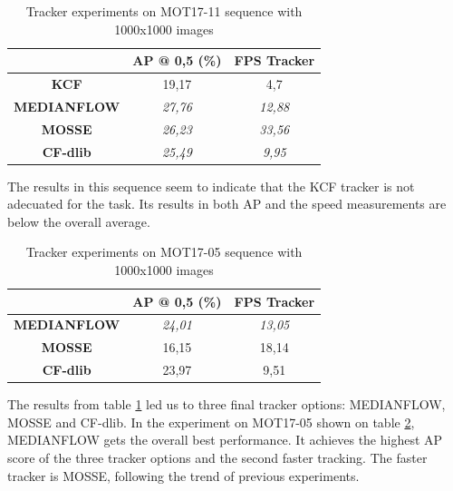 \begin{table}[H]
\scriptsize
\begin{center}
\begin{tabular}{|c|c|c|}
\hline
\textbf{}           & \textbf{AP @ 0,5 (\%)} & \textbf{FPS Tracker} \\ \hline
\textbf{KCF}        & 19,17                  & 4,7                  \\ \hline
\textbf{MEDIANFLOW} & \textit{27,76}         & \textit{12,88}       \\ \hline
\textbf{MOSSE}      & \textit{26,23}         & \textit{33,56}       \\ \hline
\textbf{CF-dlib}    & \textit{25,49}         & \textit{9,95}        \\ \hline
\end{tabular}
\end{center}
\caption{Tracker experiments on MOT17-11 sequence with 1000x1000 images}
\label{tab:tracker_exp_2}
\end{table}
The results in this sequence seem to indicate that the KCF tracker is not adecuated for the task. Its results in both AP and the speed measurements are below the overall average.
\begin{table}[H]
\scriptsize
\begin{center}
\begin{tabular}{|c|c|c|}
\hline
\textbf{}           & \textbf{AP @ 0,5 (\%)} & \textbf{FPS Tracker} \\ \hline
\textbf{MEDIANFLOW} & \textit{24,01}         & \textit{13,05}       \\ \hline
\textbf{MOSSE}      & 16,15                  & 18,14               \\ \hline
\textbf{CF-dlib}    & 23,97                  & 9,51                 \\ \hline
\end{tabular}
\end{center}
\caption{Tracker experiments on MOT17-05 sequence with 1000x1000 images}
\label{tab:tracker_exp_3}
\end{table}
The results from table \ref{tab:tracker_exp_2} led us to three final tracker options: MEDIANFLOW, MOSSE and CF-dlib. In the experiment on MOT17-05 shown on table \ref{tab:tracker_exp_3}, MEDIANFLOW gets the overall best performance. It achieves the highest AP score of the three tracker options and the second faster tracking. The faster tracker is MOSSE, following the trend of previous experiments.
